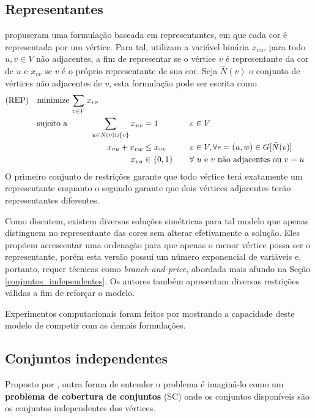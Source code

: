 \documentclass[11pt]{article}
\begin{document}
\subsection{Representantes}
\label{sec:orgbdfcb6e}
\textcite{Campelo2004CliquesHolesVertex} propuseram uma formulação baseada em representantes, em que cada cor é representada por um vértice.
Para tal, utilizam a variável binária \(x_{vu}\), para todo \(u, v \in V\) não adjacentes, a fim de representar se o vértice \(v\) é representante da cor de \(u\) e \(x_{vv}\) se \(v\) é o próprio representante de sua cor.
Seja \(\bar{N}(v)\) o conjunto de vértices não adjacentes de \(v\), esta formulação pode ser escrita como
\begin{alignat*}{4}
\mathrm{(REP)} \quad & \omit\rlap{minimize  $\displaystyle \sum_{v \in V} x_{vv}$} \\
& \mbox{sujeito a}&& \quad & \sum_{u \in \bar{N}(v) \cup \{v\}} x_{uv}&= 1        & \quad & v \in V \\
&                 &&   & x_{vu} + x_{vw}    & \leq x_{vv} &   & v \in V, \forall e = (u,w) \in G[\bar{N}(v)] \\
&                 &&   & x_{vu}       & \in \{0,1\} &   & \forall \text{ $u$ e $v$ não adjacentes ou $v = u$}
\end{alignat*}
O primeiro conjunto de restrições garante que todo vértice terá exatamente um representante enquanto o segundo garante que dois vértices adjacentes terão representantes diferentes.

Como \textcite{Campelo2008AsymmetricRepresentativesFormulation} discutem, existem diversas soluções simétricas para tal modelo que apenas distinguem no representante das cores sem alterar efetivamente a solução.
Eles propõem acrescentar uma ordenação para que apenas o menor vértice possa ser o representante, porém esta versão possui um número exponencial de variáveis e, portanto, requer técnicas como \emph{branch-and-price}, abordada mais afundo na Seção \ref{conjuntos_independentes}.
Os autores também apresentam diversas restrições válidas a fim de reforçar o modelo.

Experimentos computacionais foram feitos por \textcite{Jabrayilov2018NewIntegerLinear} mostrando a capacidade deste modelo de competir com as demais formulações.

\subsection{Conjuntos independentes}
\label{sec:org68306ef}
\label{conjuntos_independentes}
Proposto por \textcite{Mehrotra1996ColumnGenerationApproach}, outra forma de entender o problema é imaginá-lo como um \textbf{problema de cobertura de conjuntos} (SC) onde os conjuntos disponíveis são os conjuntos independentes dos vértices.
\end{document}
